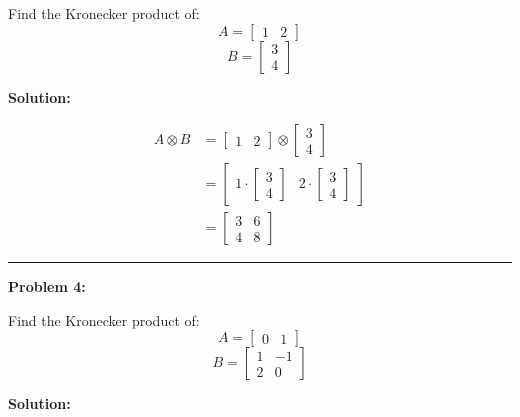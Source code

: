 \documentclass[
  letterpaper,
  DIV=11,
  numbers=noendperiod]{scrreprt}
\theoremstyle{plain}
\theoremstyle{definition}
\theoremstyle{remark}
\begin{document}
Find the Kronecker product of: \[A=\begin{bmatrix}1&2\end{bmatrix}\]
\[B=\begin{bmatrix}3\\4\end{bmatrix}\]

\textbf{Solution:}

\begin{align*}
A \otimes B &= \begin{bmatrix}1&2\end{bmatrix} \otimes \begin{bmatrix}3\\4\end{bmatrix} \\
&= \begin{bmatrix}
1 \cdot \begin{bmatrix}3\\4\end{bmatrix} & 2 \cdot \begin{bmatrix}3\\4\end{bmatrix}
\end{bmatrix} \\
&= \begin{bmatrix}
3 & 6 \\
4 & 8
\end{bmatrix}
\end{align*}

\begin{center}\rule{0.5\linewidth}{0.5pt}\end{center}

\textbf{Problem 4:}

Find the Kronecker product of: \[A=\begin{bmatrix}0&1\end{bmatrix}\]
\[B=\begin{bmatrix}1&-1\\2&0\end{bmatrix}\]

\textbf{Solution:}
\end{document}
